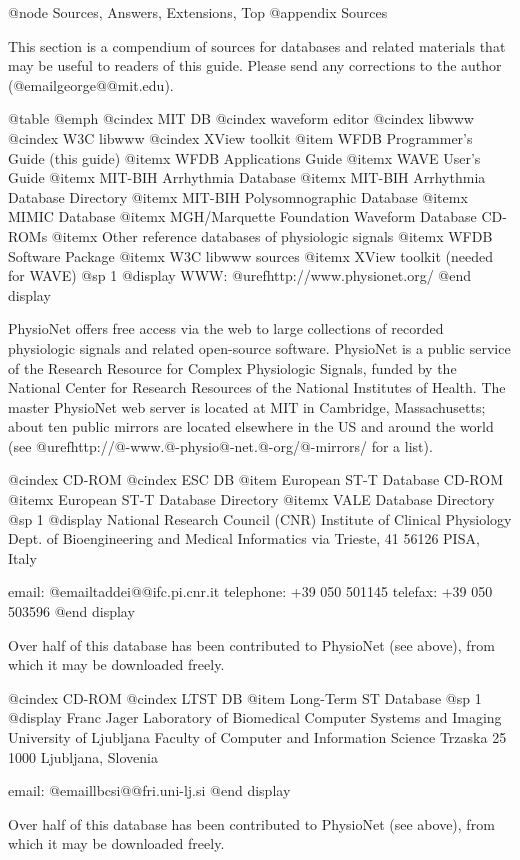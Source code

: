 {{{{{{{{{@node     Sources, Answers, Extensions, Top
@appendix Sources

This section is a compendium of sources for databases and related
materials that may be useful to readers of this guide.  Please send any
corrections to the author (@email{george@@mit.edu}).

@table @emph
@cindex MIT DB
@cindex waveform editor
@cindex libwww
@cindex W3C libwww
@cindex XView toolkit
@item WFDB Programmer's Guide (this guide)
@itemx WFDB Applications Guide
@itemx WAVE User's Guide
@itemx MIT-BIH Arrhythmia Database
@itemx MIT-BIH Arrhythmia Database Directory
@itemx MIT-BIH Polysomnographic Database
@itemx MIMIC Database
@itemx MGH/Marquette Foundation Waveform Database CD-ROMs
@itemx Other reference databases of physiologic signals
@itemx WFDB Software Package
@itemx W3C libwww sources
@itemx XView toolkit (needed for WAVE)
@sp 1
@display
WWW: @uref{http://www.physionet.org/}
@end display

PhysioNet offers free access via the web to large collections of
recorded physiologic signals and related open-source software.
PhysioNet is a public service of the Research Resource for
Complex Physiologic Signals, funded by the National Center for
Research Resources of the National Institutes of Health.  The
master PhysioNet web server is located at MIT in Cambridge, Massachusetts;
about ten public mirrors are located elsewhere in the US and around
the world (see @uref{http://@-www.@-physio@-net.@-org/@-mirrors/} for a list).

@cindex CD-ROM
@cindex ESC DB
@item European ST-T Database CD-ROM
@itemx European ST-T Database Directory
@itemx VALE Database Directory
@sp 1
@display
National Research Council (CNR) Institute of Clinical Physiology
Dept. of Bioengineering and Medical Informatics
via Trieste, 41
56126 PISA, Italy

email: @email{taddei@@ifc.pi.cnr.it}
telephone: +39 050 501145
telefax: +39 050 503596
@end display

Over half of this database has been contributed to PhysioNet (see above), from
which it may be downloaded freely.

@cindex CD-ROM
@cindex LTST DB
@item Long-Term ST Database
@sp 1
@display
Franc Jager
Laboratory of Biomedical Computer Systems and Imaging
University of Ljubljana
Faculty of Computer and Information Science
Trzaska 25
1000 Ljubljana, Slovenia

email: @email{lbcsi@@fri.uni-lj.si}
@end display

Over half of this database has been contributed to PhysioNet (see above), from
which it may be downloaded freely.

}}}}}}}}}
